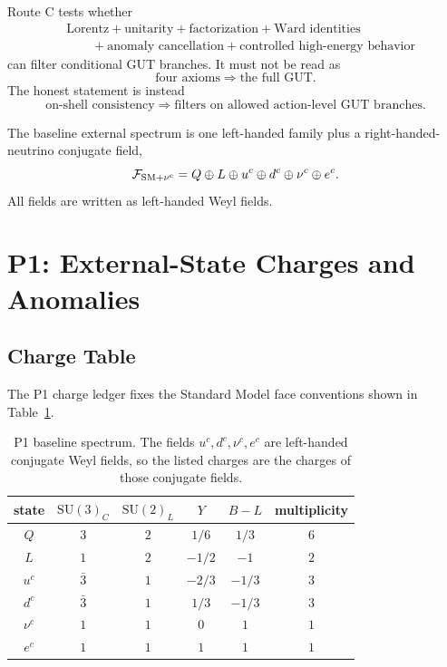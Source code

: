 \documentclass[11pt]{article}
\newcommand{\SU}{\mathrm{SU}}
\newcommand{\bml}{B-L}
\newcommand{\uc}{u^c}
\newcommand{\dc}{d^c}
\newcommand{\nuc}{\nu^c}
\newcommand{\ec}{e^c}
\begin{document}
Route C tests whether
\begin{equation}
\begin{split}
  &\text{Lorentz}
  + \text{unitarity}
  + \text{factorization}
  + \text{Ward identities} \\
  &\qquad
  + \text{anomaly cancellation}
  + \text{controlled high-energy behavior}
\end{split}
\end{equation}
can filter conditional GUT branches.  It must not be read as
\begin{equation}
  \text{four axioms} \Longrightarrow \text{the full GUT}.
\end{equation}
The honest statement is instead
\begin{equation}
  \text{on-shell consistency} \Longrightarrow
  \text{filters on allowed action-level GUT branches}.
\end{equation}

The baseline external spectrum is one left-handed family plus a
right-handed-neutrino conjugate field,
\begin{equation}
  \mathcal F_{\rm SM+\nu^c}
  =
  Q \oplus L \oplus \uc \oplus \dc \oplus \nuc \oplus \ec .
\end{equation}
All fields are written as left-handed Weyl fields.

\section{P1: External-State Charges and Anomalies}

\subsection{Charge Table}

The P1 charge ledger fixes the Standard Model face conventions shown in
Table~\ref{tab:p1-charges}.

\begin{table}[h]
\centering
\begin{tabular}{c c c c c c}
\toprule
state & $\SU(3)_C$ & $\SU(2)_L$ & $Y$ & $\bml$ & multiplicity \\
\midrule
$Q$    & $3$        & $2$ & $1/6$   & $1/3$  & $6$ \\
$L$    & $1$        & $2$ & $-1/2$  & $-1$   & $2$ \\
$\uc$  & $\bar 3$   & $1$ & $-2/3$  & $-1/3$ & $3$ \\
$\dc$  & $\bar 3$   & $1$ & $1/3$   & $-1/3$ & $3$ \\
$\nuc$ & $1$        & $1$ & $0$     & $1$    & $1$ \\
$\ec$  & $1$        & $1$ & $1$     & $1$    & $1$ \\
\bottomrule
\end{tabular}
\caption{P1 baseline spectrum.  The fields $\uc,\dc,\nuc,\ec$ are
left-handed conjugate Weyl fields, so the listed charges are the charges
of those conjugate fields.}
\label{tab:p1-charges}
\end{table}
\end{document}
